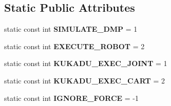 \subsection*{Static Public Attributes}
\begin{DoxyCompactItemize}
\item 
\hypertarget{classkukadu_1_1DMPExecutor_acb1421363d995248e27fa60080cddf81}{static const int {\bfseries S\-I\-M\-U\-L\-A\-T\-E\-\_\-\-D\-M\-P} = 1}\label{classkukadu_1_1DMPExecutor_acb1421363d995248e27fa60080cddf81}

\item 
\hypertarget{classkukadu_1_1DMPExecutor_aa91af5f6472064191b6f53824f25d608}{static const int {\bfseries E\-X\-E\-C\-U\-T\-E\-\_\-\-R\-O\-B\-O\-T} = 2}\label{classkukadu_1_1DMPExecutor_aa91af5f6472064191b6f53824f25d608}

\item 
\hypertarget{classkukadu_1_1DMPExecutor_a4d1aa7315001e2e1ea4ceb22d564f5af}{static const int {\bfseries K\-U\-K\-A\-D\-U\-\_\-\-E\-X\-E\-C\-\_\-\-J\-O\-I\-N\-T} = 1}\label{classkukadu_1_1DMPExecutor_a4d1aa7315001e2e1ea4ceb22d564f5af}

\item 
\hypertarget{classkukadu_1_1DMPExecutor_a411b6f06a54d54edf5dd071530323284}{static const int {\bfseries K\-U\-K\-A\-D\-U\-\_\-\-E\-X\-E\-C\-\_\-\-C\-A\-R\-T} = 2}\label{classkukadu_1_1DMPExecutor_a411b6f06a54d54edf5dd071530323284}

\item 
\hypertarget{classkukadu_1_1DMPExecutor_a7c95850684d0431a4a554b8ecf3dbe62}{static const int {\bfseries I\-G\-N\-O\-R\-E\-\_\-\-F\-O\-R\-C\-E} = -\/1}\label{classkukadu_1_1DMPExecutor_a7c95850684d0431a4a554b8ecf3dbe62}

\end{DoxyCompactItemize}
